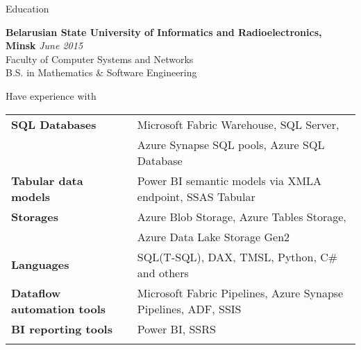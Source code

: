 \documentclass{resume} %
\begin{document}

\begin{rSection}{Education}

{\bf Belarusian State University of Informatics and Radioelectronics, Minsk} \hfill {\em June 2015} \\ 
Faculty of Computer Systems and Networks \\
B.S. in Mathematics \& Software Engineering \\

\end{rSection}


\begin{rSection}{Have experience with}

\begin{tabular}{ @{} >{\bfseries}l @{\hspace{6ex}} l }
SQL Databases          & Microsoft Fabric Warehouse, SQL Server, \smallskip \\
 & Azure Synapse SQL pools, Azure SQL Database \smallskip \\
Tabular data models        & Power BI semantic models via XMLA endpoint, SSAS Tabular \smallskip \\
Storages  & Azure Blob Storage, Azure Tables Storage, \smallskip \\
 & Azure Data Lake Storage Gen2 \smallskip \\
Languages  & SQL(T-SQL), DAX, TMSL, Python, C\# and others \smallskip \\
Dataflow automation tools & Microsoft Fabric Pipelines, Azure Synapse Pipelines, ADF, SSIS \smallskip \\
BI reporting tools               & Power BI, SSRS \smallskip \\
\smallskip \\
\end{tabular}

\end{rSection}

\end{document}
